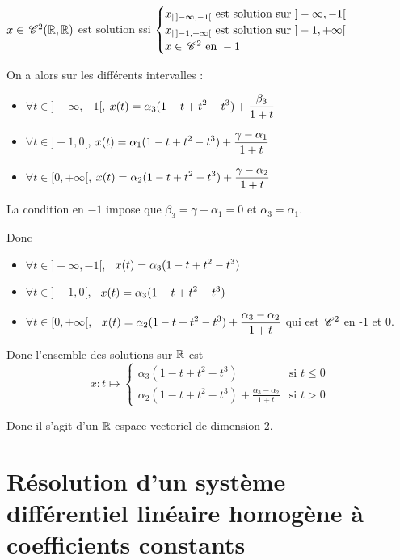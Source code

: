 \begin{exemple}
    $x \in \,\mathscr C^{2} (\mathbb{R}, \mathbb{R})$ est solution ssi 
    $\begin{cases}
        x_{|\,]-\infty, -1[} \text{ est solution sur } ]-\infty, -1[ \\
        x_{|\,]-1, + \infty[} \text{ est solution sur } ]-1, +\infty[ \\
        x \in \,\mathscr C^{2} \text{ en } -1
    \end{cases}$

    On a alors sur les différents intervalles :
    \begin{itemize}
        \item $\forall t \in ]-\infty, -1[$, $\displaystyle x(t) = \alpha_3 (1 - t + t^2 - t^3) + \frac{\beta_3} {1 + t}$
        \item $\forall t \in ]-1, 0[$, $\displaystyle x(t) = \alpha_1 (1 - t + t^2 - t^3) + \frac{\gamma - \alpha_1} {1 + t}$
        \item $\forall t \in [0, + \infty[$, $\displaystyle x(t) = \alpha_2 (1 - t + t^2 - t^3) + \frac{\gamma - \alpha_2} {1 + t}$
    \end{itemize}
    
    La condition en $-1$ impose que $\beta_3 = \gamma - \alpha_1 = 0$ et 
    $\alpha_3 = \alpha_1$.

    Donc 
    \begin{itemize}
        \item $\forall t \in ] - \infty, -1[$, \, $\displaystyle x(t) = \alpha_3 ( 1 - t + t^2 - t^3)$
        \item $\forall t \in ]-1, 0[$, \, $\displaystyle x(t) = \alpha_3 (1 - t + t^2 - t^3)$
        \item $\forall t \in [0, +\infty[$, \, $\displaystyle x(t) = \alpha_2 (1 - t + t^2 - t^3) + \frac{\alpha_3 - \alpha_2} {1 + t}$
        qui est $\,\mathscr C^{2}$ en -1 et 0. 
    \end{itemize}

    Donc l'ensemble des solutions sur $\mathbb{R}$ est $$x : t \mapsto \begin{cases}
        \alpha_3 (1 - t + t^2 - t^3) & \text{si } t \leqslant 0 \\
        \alpha_2 (1 - t + t^2 - t^3) + \frac{\alpha_3 - \alpha_2} {1 + t} & \text{si } t > 0
    \end{cases}$$

    Donc il s'agit d'un $\mathbb{R}$-espace vectoriel de dimension 2. 
\end{exemple}

\section{Résolution d'un système différentiel linéaire homogène à coefficients constants}
